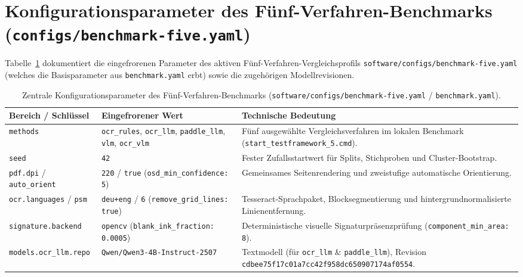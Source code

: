 \section{Konfigurationsparameter des Fünf-Verfahren-Benchmarks (\texttt{configs/benchmark-five.yaml})}
\label{app:konfiguration}

Tabelle~\ref{tab:anhang-config} dokumentiert die eingefrorenen Parameter des aktiven Fünf-Verfahren-Vergleichsprofils \texttt{software/configs/benchmark-five.yaml} (welches die Basisparameter aus \texttt{benchmark.yaml} erbt) sowie die zugehörigen Modellrevisionen.

\begin{table}[htbp]
  \centering
  \caption[Zentrale Konfigurationsparameter des Fünf-Verfahren-Benchmarks]{Zentrale Konfigurationsparameter des Fünf-Verfahren-Benchmarks (\texttt{software/configs/benchmark-five.yaml} / \texttt{benchmark.yaml}).}
  \label{tab:anhang-config}
  \footnotesize
  \begin{tabularx}{\textwidth}{@{}>{\raggedright\arraybackslash}p{} >{\raggedright\arraybackslash}p{} >{\raggedright\arraybackslash}X@{}}
    \toprule
    \textbf{Bereich / Schlüssel} & \textbf{Eingefrorener Wert} & \textbf{Technische Bedeutung} \\
    \midrule
    \texttt{methods} & \texttt{ocr\_rules}, \texttt{ocr\_llm}, \texttt{paddle\_llm}, \texttt{vlm}, \texttt{ocr\_vlm} & Fünf ausgewählte Vergleichsverfahren im lokalen Benchmark (\texttt{start\_testframework\_5.cmd}). \\
    \addlinespace[2pt]
    \texttt{seed} & \texttt{42} & Fester Zufallsstartwert für Splits, Stichproben und Cluster-Bootstrap. \\
    \addlinespace[2pt]
    \texttt{pdf.dpi} / \texttt{auto\_orient} & \texttt{220} / \texttt{true} (\texttt{osd\_min\_confidence: 5}) & Gemeinsames Seitenrendering und zweistufige automatische Orientierung. \\
    \addlinespace[2pt]
    \texttt{ocr.languages} / \texttt{psm} & \texttt{deu+eng} / \texttt{6} (\texttt{remove\_grid\_lines: true}) & Tesseract-Sprachpaket, Blocksegmentierung und hintergrundnormalisierte Linienentfernung. \\
    \addlinespace[2pt]
    \texttt{signature.backend} & \texttt{opencv} (\texttt{blank\_ink\_fraction: 0.0005}) & Deterministische visuelle Signaturpräsenzprüfung (\texttt{component\_min\_area: 8}). \\
    \addlinespace[2pt]
    \texttt{models.ocr\_llm.repo} & \texttt{Qwen/\allowbreak Qwen3-4B-Instruct-2507} & Textmodell (für \texttt{ocr\_llm} \& \texttt{paddle\_llm}), Revision \texttt{cdbee75f17c01a7cc42f\allowbreak 958dc650907174af0554}. \\

\end{tabularx}
\end{table}
